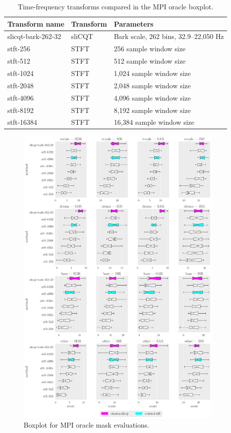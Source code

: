 \documentclass[report.tex]{subfiles}
\begin{document}
\begin{table}[ht]
	\centering
	\caption{Time-frequency transforms compared in the MPI oracle boxplot.}
	\label{table:winsizes}
	\begin{tabular}{ |l|l|l| }
	 \hline
		Transform name & Transform & Parameters \\
	 \hline
	 \hline
		slicqt-bark-262-32 & sliCQT & Bark scale, 262 bins, 32.9--22,050 Hz \\
	 \hline
		stft-256 & STFT & 256 sample window size \\
	 \hline
		stft-512 & STFT & 512 sample window size \\
	 \hline
		stft-1024 & STFT & 1,024 sample window size \\
	 \hline
		stft-2048 & STFT & 2,048 sample window size \\
	 \hline
		stft-4096 & STFT & 4,096 sample window size \\
	 \hline
		stft-8192 & STFT & 8,192 sample window size \\
	 \hline
		stft-16384 & STFT & 16,384 sample window size \\
	 \hline
\end{tabular}
\end{table}

\begin{figure}[ht]
	\centering
	\includegraphics[width=0.9\textwidth]{./images-bss/oracle_boxplot.pdf}
	\caption{Boxplot for MPI oracle mask evaluations.}
	\label{fig:oraclebssboxplot}
\end{figure}
\end{document}
